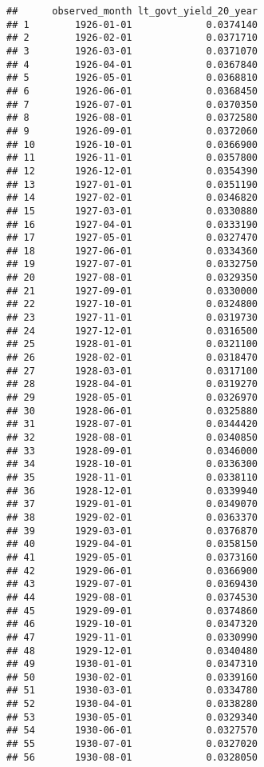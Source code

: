 \documentclass[
]{article}
\begin{document}
\begin{verbatim}
##      observed_month lt_govt_yield_20_year
## 1        1926-01-01             0.0374140
## 2        1926-02-01             0.0371710
## 3        1926-03-01             0.0371070
## 4        1926-04-01             0.0367840
## 5        1926-05-01             0.0368810
## 6        1926-06-01             0.0368450
## 7        1926-07-01             0.0370350
## 8        1926-08-01             0.0372580
## 9        1926-09-01             0.0372060
## 10       1926-10-01             0.0366900
## 11       1926-11-01             0.0357800
## 12       1926-12-01             0.0354390
## 13       1927-01-01             0.0351190
## 14       1927-02-01             0.0346820
## 15       1927-03-01             0.0330880
## 16       1927-04-01             0.0333190
## 17       1927-05-01             0.0327470
## 18       1927-06-01             0.0334360
## 19       1927-07-01             0.0332750
## 20       1927-08-01             0.0329350
## 21       1927-09-01             0.0330000
## 22       1927-10-01             0.0324800
## 23       1927-11-01             0.0319730
## 24       1927-12-01             0.0316500
## 25       1928-01-01             0.0321100
## 26       1928-02-01             0.0318470
## 27       1928-03-01             0.0317100
## 28       1928-04-01             0.0319270
## 29       1928-05-01             0.0326970
## 30       1928-06-01             0.0325880
## 31       1928-07-01             0.0344420
## 32       1928-08-01             0.0340850
## 33       1928-09-01             0.0346000
## 34       1928-10-01             0.0336300
## 35       1928-11-01             0.0338110
## 36       1928-12-01             0.0339940
## 37       1929-01-01             0.0349070
## 38       1929-02-01             0.0363370
## 39       1929-03-01             0.0376870
## 40       1929-04-01             0.0358150
## 41       1929-05-01             0.0373160
## 42       1929-06-01             0.0366900
## 43       1929-07-01             0.0369430
## 44       1929-08-01             0.0374530
## 45       1929-09-01             0.0374860
## 46       1929-10-01             0.0347320
## 47       1929-11-01             0.0330990
## 48       1929-12-01             0.0340480
## 49       1930-01-01             0.0347310
## 50       1930-02-01             0.0339160
## 51       1930-03-01             0.0334780
## 52       1930-04-01             0.0338280
## 53       1930-05-01             0.0329340
## 54       1930-06-01             0.0327570
## 55       1930-07-01             0.0327020
## 56       1930-08-01             0.0328050

\end{verbatim}
\end{document}
